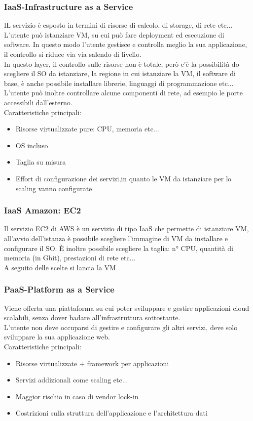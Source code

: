 \documentclass[16px]{article}
\begin{document}
\subsubsection{IaaS-Infrastructure as a Service}
IL servizio è esposto in termini di risorse di calcolo, di storage, di rete etc... L'utente può istanziare VM, su cui può fare deployment ed esecuzione di software. In questo modo l'utente gestisce e controlla meglio la sua applicazione, il controllo si riduce via via salendo di livello.\\ In questo layer, il controllo sulle risorse non è totale, però c'è la possibilità do scegliere il SO da istanziare, la regione in cui istanziare la VM, il software di base, è anche possibile installare librerie, linguaggi di programmazione etc... L'utente può inoltre controllare alcune componenti di rete, ad esempio le porte accessibili dall'esterno.\\ Caratteristiche principali:
\begin{itemize}
\item Risorse virtualizzate pure: CPU, memoria etc...
\item OS incluso
\item Taglia su misura
\item Effort di configurazione dei servizi,in quanto le VM da istanziare per lo scaling vanno configurate
\end{itemize}
\subsubsection{IaaS Amazon: EC2}
Il servizio EC2 di AWS è un servizio di tipo IaaS che permette di istanziare VM, all'avvio dell'istanza è possibile scegliere l'immagine di VM da installare e configurare il SO. È inoltre possibile scegliere la taglia: n° CPU, quantità di memoria (in Gbit), prestazioni di rete etc...\\ A seguito delle scelte si lancia la VM
\subsubsection{PaaS-Platform as a Service}
Viene offerta una piattaforma su cui poter sviluppare e gestire applicazioni cloud scalabili, senza dover badare all'infrastruttura sottostante.\\ L'utente non deve occuparsi di gestire e configurare gli altri servizi, deve solo sviluppare la sua applicazione web.\\ Caratteristiche principali:
\begin{itemize}
\item Risorse virtualizzate + framework per applicazioni
\item Servizi addizionali come scaling etc...
\item Maggior rischio in caso di vendor lock-in
\item Costrizioni sulla struttura dell'applicazione e l'architettura dati
\end{itemize}
\end{document}
